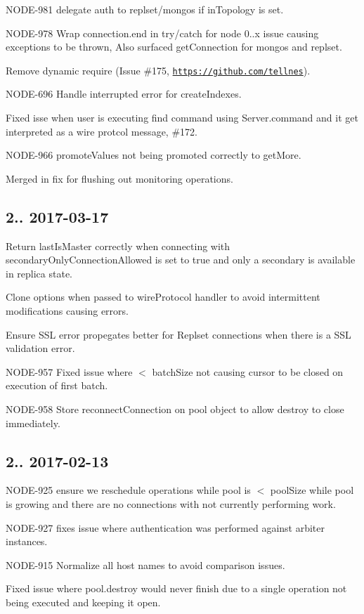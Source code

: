 \begin{DoxyItemize}
\item N\+O\+D\+E-\/981 delegate auth to replset/mongos if in\+Topology is set.
\item N\+O\+D\+E-\/978 Wrap connection.\+end in try/catch for node 0..\+x issue causing exceptions to be thrown, Also surfaced get\+Connection for mongos and replset.
\item Remove dynamic require (Issue \#175, \href{https://github.com/tellnes}{\tt https\+://github.\+com/tellnes}).
\item N\+O\+D\+E-\/696 Handle interrupted error for create\+Indexes.
\item Fixed isse when user is executing find command using Server.\+command and it get interpreted as a wire protcol message, \#172.
\item N\+O\+D\+E-\/966 promote\+Values not being promoted correctly to get\+More.
\item Merged in fix for flushing out monitoring operations.
\end{DoxyItemize}

\subsection*{2.. 2017-\/03-\/17 }


\begin{DoxyItemize}
\item Return last\+Is\+Master correctly when connecting with secondary\+Only\+Connection\+Allowed is set to true and only a secondary is available in replica state.
\item Clone options when passed to wire\+Protocol handler to avoid intermittent modifications causing errors.
\item Ensure S\+SL error propegates better for Replset connections when there is a S\+SL validation error.
\item N\+O\+D\+E-\/957 Fixed issue where $<$ batch\+Size not causing cursor to be closed on execution of first batch.
\item N\+O\+D\+E-\/958 Store reconnect\+Connection on pool object to allow destroy to close immediately.
\end{DoxyItemize}

\subsection*{2.. 2017-\/02-\/13 }


\begin{DoxyItemize}
\item N\+O\+D\+E-\/925 ensure we reschedule operations while pool is $<$ pool\+Size while pool is growing and there are no connections with not currently performing work.
\item N\+O\+D\+E-\/927 fixes issue where authentication was performed against arbiter instances.
\item N\+O\+D\+E-\/915 Normalize all host names to avoid comparison issues.
\item Fixed issue where pool.\+destroy would never finish due to a single operation not being executed and keeping it open.
\end{DoxyItemize}

